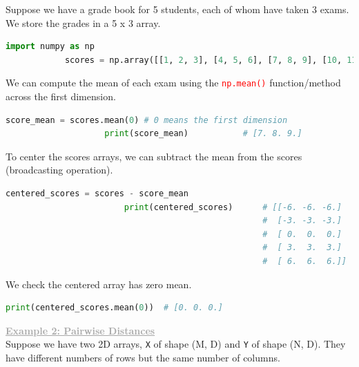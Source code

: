 \documentclass{book}
\begin{document}
\vspace{1mm}
Suppose we have a grade book for 5 students, each of whom have taken 3 exams. We store the grades in a 5 x 3 array.\\
\begin{lstlisting}[language=Python, basicstyle=\ttfamily\small, keywordstyle=\color{blue}, commentstyle=\color{forestgreen}, stringstyle=\color{red}, showstringspaces=false]
            import numpy as np
            scores = np.array([[1, 2, 3], [4, 5, 6], [7, 8, 9], [10, 11, 12], [13, 14, 15]])
\end{lstlisting}
We can compute the mean of each exam using the \textcolor{red}{\texttt{np.mean()}} function/method across the first dimension.
\begin{lstlisting}[language=Python, basicstyle=\ttfamily\small, keywordstyle=\color{blue}, commentstyle=\color{forestgreen}, stringstyle=\color{red}, showstringspaces=false]
                    score_mean = scores.mean(0) # 0 means the first dimension
                    print(score_mean)           # [7. 8. 9.]
\end{lstlisting}
To center the scores arrays, we can subtract the mean from the scores (broadcasting operation).
\begin{lstlisting}[language=Python, basicstyle=\ttfamily\small, keywordstyle=\color{blue}, commentstyle=\color{forestgreen}, stringstyle=\color{red}, showstringspaces=false]
                        centered_scores = scores - score_mean
                        print(centered_scores)      # [[-6. -6. -6.]
                                                    #  [-3. -3. -3.]
                                                    #  [ 0.  0.  0.]
                                                    #  [ 3.  3.  3.]
                                                    #  [ 6.  6.  6.]]
\end{lstlisting}
We check the centered array has zero mean.
\begin{lstlisting}[language=Python, basicstyle=\ttfamily\small, keywordstyle=\color{blue}, commentstyle=\color{forestgreen}, stringstyle=\color{red}, showstringspaces=false]
                        print(centered_scores.mean(0))  # [0. 0. 0.]
\end{lstlisting}
\vspace{2mm}
\textcolor{darkgray}{\underline{\textbf{Example 2: Pairwise Distances}}}\\
\vspace{1mm}
Suppose we have two 2D arrays, \texttt{X} of shape (M, D) and \texttt{Y} of shape (N, D). They have different numbers of rows but the same number of columns.\\
\end{document}
